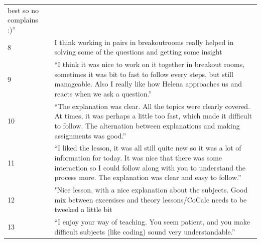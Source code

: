 \documentclass[paper=a4,justified,a4paper]{tufte-handout}
\begin{document}
\begin{longtable}[]{@{}ll@{}}
\begin{minipage}[t]{0.90\columnwidth}
best so no complains :)''\strut
\end{minipage}\tabularnewline
\begin{minipage}[t]{0.04\columnwidth}\raggedright
8\strut
\end{minipage} & \begin{minipage}[t]{0.90\columnwidth}\raggedright
\scriptsize I think working in pairs in breakoutrooms really helped in
solving some of the questions and getting some insight\strut
\end{minipage}\tabularnewline
\begin{minipage}[t]{0.04\columnwidth}\raggedright
9\strut
\end{minipage} & \begin{minipage}[t]{0.90\columnwidth}\raggedright
\scriptsize ``I think it was nice to work on it together in breakout
rooms, sometimes it was bit to fast to follow every steps, but still
manageable. Also I really like how Helena approaches us and reacts when
we ask a question.''\strut
\end{minipage}\tabularnewline
\begin{minipage}[t]{0.04\columnwidth}\raggedright
10\strut
\end{minipage} & \begin{minipage}[t]{0.90\columnwidth}\raggedright
\scriptsize ``The explanation was clear. All the topics were clearly
covered. At times, it was perhaps a little too fast, which made it
difficult to follow. The alternation between explanations and making
assignments was good.''\strut
\end{minipage}\tabularnewline
\begin{minipage}[t]{0.04\columnwidth}\raggedright
11\strut
\end{minipage} & \begin{minipage}[t]{0.90\columnwidth}\raggedright
\scriptsize ``I liked the lesson, it was all still quite new so it was a
lot of information for today. It was nice that there was some
interaction so I could follow along with you to understand the process
more. The explanation was clear and easy to follow.''\strut
\end{minipage}\tabularnewline
\begin{minipage}[t]{0.04\columnwidth}\raggedright
12\strut
\end{minipage} & \begin{minipage}[t]{0.90\columnwidth}\raggedright
\scriptsize "Nice lesson, with a nice explanation about the subjects.
Good mix between excersises and theory lessons/CoCalc needs to be
tweeked a little bit\strut
\end{minipage}\tabularnewline
\begin{minipage}[t]{0.04\columnwidth}\raggedright
13\strut
\end{minipage} & \begin{minipage}[t]{0.90\columnwidth}\raggedright
\scriptsize ``I enjoy your way of teaching. You seem patient, and you
make difficult subjects (like coding) sound very understandable.''\strut
\end{minipage}\tabularnewline
\bottomrule
\end{longtable}

\renewcommand\refname{References}



\end{document}
